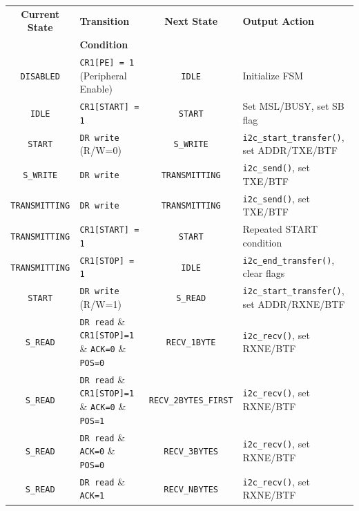 \begin{table}[H]
    \small

    \begin{tabularx}{\textwidth}{|c|X|c|X|}
        \hline
        \textbf{Current State}  & \textbf{Transition }  & \textbf{Next State}   & \textbf{Output Action}    \\
                                & \textbf{Condition}    &                       &                           \\
        \hline
        \texttt{DISABLED} & \texttt{CR1[PE] = 1} (Peripheral Enable) & \texttt{IDLE} & Initialize FSM \\
        \hline
        \texttt{IDLE} & \texttt{CR1[START] = 1} & \texttt{START} & Set MSL/BUSY, set SB flag \\
        \hline
        \texttt{START} & \texttt{DR write} (R/W=0) & \texttt{S\_WRITE} & \texttt{i2c\_start\_transfer()}, set ADDR/TXE/BTF \\
        \hline
        \texttt{S\_WRITE} & \texttt{DR write} & \texttt{TRANSMITTING} & \texttt{i2c\_send()}, set TXE/BTF \\
        \hline
        \texttt{TRANSMITTING} & \texttt{DR write} & \texttt{TRANSMITTING} & \texttt{i2c\_send()}, set TXE/BTF \\
        \hline
        \texttt{TRANSMITTING} & \texttt{CR1[START] = 1} & \texttt{START} & Repeated START condition \\
        \hline
        \texttt{TRANSMITTING} & \texttt{CR1[STOP] = 1} & \texttt{IDLE} & \texttt{i2c\_end\_transfer()}, clear flags \\
        \hline
        \texttt{START} & \texttt{DR write} (R/W=1) & \texttt{S\_READ} & \texttt{i2c\_start\_transfer()}, set ADDR/RXNE/BTF \\
        \hline
        \texttt{S\_READ} & \texttt{DR read} \& \texttt{CR1[STOP]=1} \& \texttt{ACK=0} \& \texttt{POS=0} & \texttt{RECV\_1BYTE} & \texttt{i2c\_recv()}, set RXNE/BTF \\
        \hline
        \texttt{S\_READ} & \texttt{DR read} \& \texttt{CR1[STOP]=1} \& \texttt{ACK=0} \& \texttt{POS=1} & \texttt{RECV\_2BYTES\_FIRST} & \texttt{i2c\_recv()}, set RXNE/BTF \\
        \hline
        \texttt{S\_READ} & \texttt{DR read} \& \texttt{ACK=0} \& \texttt{POS=0} & \texttt{RECV\_3BYTES} & \texttt{i2c\_recv()}, set RXNE/BTF \\
        \hline
        \texttt{S\_READ} & \texttt{DR read} \& \texttt{ACK=1} & \texttt{RECV\_NBYTES} & \texttt{i2c\_recv()}, set RXNE/BTF \\

\end{tabularx}
\end{table}

